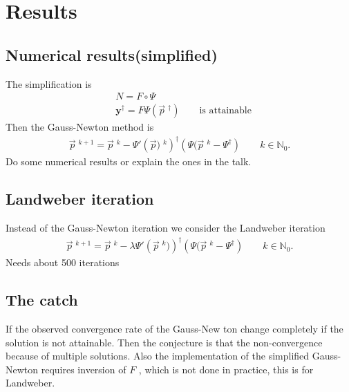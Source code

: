 \section{Results}
\subsection{Numerical results(simplified)}
The simplification is
\begin{align}
    &N = F \circ \Psi \\
    &\mathbf{y}^{\dagger} = F\Psi(\vec{p}\;^{\dagger}) \qquad \text{is
    attainable}
\end{align}
Then the Gauss-Newton method is
\begin{align}
    \vec{p}\;^{k+1} = \vec{p}\;^{k} - \Psi'\left(\vec{p})\;^{k}  \right)^{\dagger}
    \left( \Psi(\vec{p}\;^{k} - \Psi^{\dagger} \right) \qquad k \in
    \mathbb{N}_0.
\end{align}
Do some numerical  results or explain the ones in the talk.
\subsection{Landweber iteration}
Instead of the Gauss-Newton iteration we consider the Landweber iteration
\begin{align}
    \vec{p}\;^{k+1} = \vec{p}\;^{k} - \lambda \Psi'\left(\vec{p}\;^{k})  \right)^{\dagger}
    \left( \Psi(\vec{p}\;^{k} - \Psi^{\dagger} \right) \qquad k \in
    \mathbb{N}_0.
\end{align}
Needs about 500 iterations
\subsection{The catch}
If the observed convergence rate of the Gauss-New ton change completely if the
solution is not attainable. Then the conjecture is that the non-convergence
because of multiple solutions.
Also the implementation of the simplified Gauss-Newton requires inversion of
$F$ , which is not done in practice, this is for Landweber.

